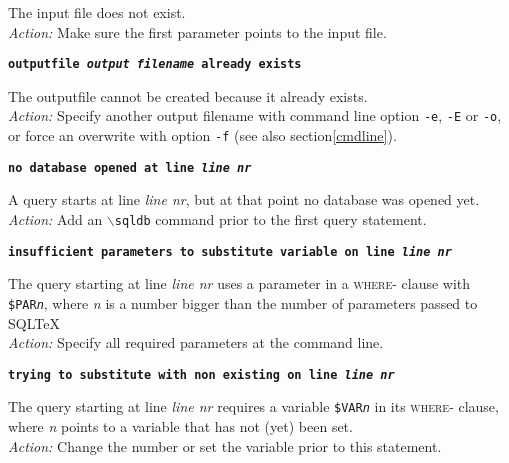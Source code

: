 \documentclass{article}
\newcommand{\bs}{\ensuremath{\backslash}}
\newcommand{\vs}{\vspace{3mm}}
\begin{document}
\vspace{1mm}

\noindent The input file does not exist.\\
\textit{Action:} Make sure the first parameter points to the input file.

\vs

\noindent\textbf{\texttt{outputfile \textit{output filename} already exists}}

\vspace{1mm}

\noindent The outputfile cannot be created because it already exists.\\
\textit{Action:} Specify another output filename with command line option \texttt{-e},
\texttt{-E} or \texttt{-o}, or force an overwrite with option \texttt{-f} (see also section\ref{cmdline}).

\vs

\noindent\textbf{\texttt{no database opened at line \textit{line nr}}}

\vspace{1mm}

\noindent A query starts at line \textit{line nr}, but at that point no database was opened yet. \\
\textit{Action:} Add an \texttt{\bs sqldb} command prior to the first query statement.

\vs

\noindent\textbf{\texttt{insufficient parameters to substitute variable on line \textit{line nr}}}

\vspace{1mm}

\noindent The query starting at line \textit{line nr} uses a parameter in a \textsc{where}- clause with
\texttt{\$PAR\textit{n}}, where \textit{n} is a number bigger than the number of parameters
passed to SQL\TeX\. \\
\textit{Action:} Specify all required parameters at the command line.

\vs

\noindent\textbf{\texttt{trying to substitute with non existing on line \textit{line nr}}}

\vspace{1mm}

\noindent The query starting at line \textit{line nr} requires a variable \texttt{\$VAR\textit{n}} in its
\textsc{where}- clause, where \textit{n} points to a variable that has not (yet) been set. \\
\textit{Action:} Change the number or set the variable prior to this statement.
\end{document}

